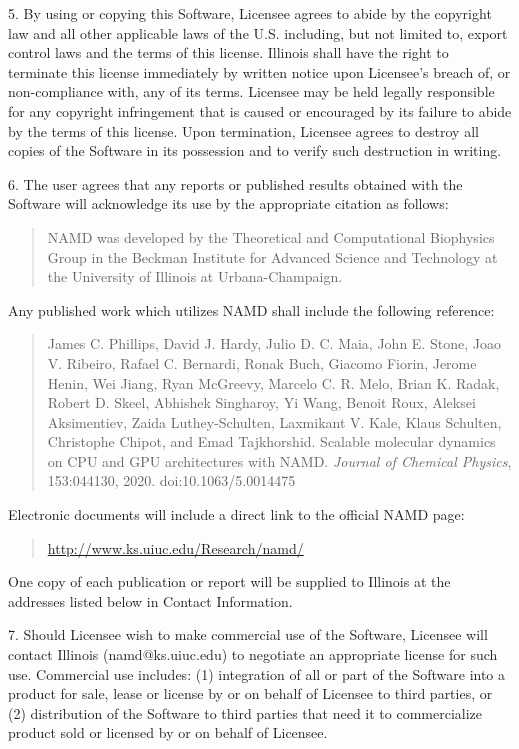 5. By using or copying this Software, Licensee agrees to abide by the
copyright law and all other applicable laws of the U.S. including, but 
not limited to, export control laws and the terms of this license. 
Illinois shall have the right to terminate this license immediately by 
written notice upon Licensee's breach of, or non-compliance with, any 
of its terms. Licensee may be held legally responsible for any copyright 
infringement that is caused or encouraged by its failure to abide by 
the terms of this license. Upon termination, Licensee agrees to destroy 
all copies of the Software in its possession and to verify such 
destruction in writing.

6. The user agrees that any reports or published results obtained 
with the Software will acknowledge its use by the appropriate citation 
as follows: 

\begin{quote}
 NAMD was developed by the Theoretical and Computational Biophysics Group in the 
 Beckman Institute for Advanced Science and Technology at the 
 University of Illinois at Urbana-Champaign.
\end{quote}

Any published work which utilizes NAMD shall include the following reference: 

\begin{quote}
 James C. Phillips, David J. Hardy, Julio D. C. Maia, John E. Stone,
 Joao V. Ribeiro, Rafael C. Bernardi, Ronak Buch, Giacomo Fiorin,
 Jerome Henin, Wei Jiang, Ryan McGreevy, Marcelo C. R. Melo,
 Brian K. Radak, Robert D. Skeel, Abhishek Singharoy, Yi Wang, Benoit Roux,
 Aleksei Aksimentiev, Zaida Luthey-Schulten, Laxmikant V. Kale,
 Klaus Schulten, Christophe Chipot, and Emad Tajkhorshid.
 Scalable molecular dynamics on CPU and GPU architectures with NAMD.
 {\it Journal of Chemical Physics}, 153:044130, 2020. doi:10.1063/5.0014475 
\end{quote}

Electronic documents will include a direct link to the official NAMD page:

\begin{quote}
\url{http://www.ks.uiuc.edu/Research/namd/}
\end{quote}

One copy of each publication or report will be supplied to Illinois 
at the addresses listed below in Contact Information.

7. Should Licensee wish to make commercial use of the Software, Licensee 
will contact Illinois (namd@ks.uiuc.edu) to negotiate an appropriate 
license for such use. Commercial use includes: (1) integration of all 
or part of the Software into a product for sale, lease or license by or 
on behalf of Licensee to third parties, or (2) distribution of the 
Software to third parties that need it to commercialize product sold or 
licensed by or on behalf of Licensee.

